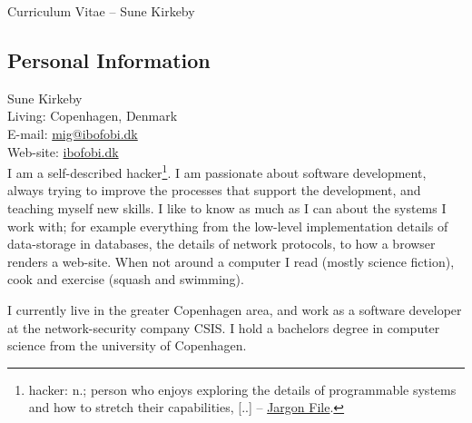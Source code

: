 \documentclass[margin,line,a4paper]{resume}
\begin{document}
{\sc \Large Curriculum Vitae -- Sune Kirkeby}
\begin{resume}

\section{\mysidestyle Personal Information}\vspace{1mm}
Sune Kirkeby \\
Living: Copenhagen, Denmark \\
E-mail: \href{mailto:mig@ibofobi.dk}{mig@ibofobi.dk} \\
Web-site: \href{http://ibofobi.dk/}{ibofobi.dk}\\

I am a self-described hacker\footnote{hacker: n.;  person who enjoys exploring
the details of programmable systems and how to stretch their capabilities,
[..] -- \href{http://www.catb.org/jargon/html/H/hacker.html}{Jargon File}.}.
I am passionate about software development, always trying to improve the
processes that support the development, and teaching myself new skills. I like
to know as much as I can about the systems I work with; for example everything
from the low-level implementation details of data-storage in databases, the
details of network protocols, to how a browser renders a web-site.
When not around a computer I read (mostly science fiction), cook and exercise
(squash and swimming).

I currently live in the greater Copenhagen area, and work as a software
developer at the network-security company CSIS. I hold a bachelors degree in
computer science from the university of Copenhagen.


\end{resume}
\end{document}
